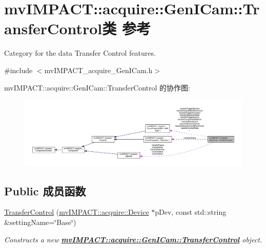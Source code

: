 \hypertarget{classmv_i_m_p_a_c_t_1_1acquire_1_1_gen_i_cam_1_1_transfer_control}{\section{mv\+I\+M\+P\+A\+C\+T\+:\+:acquire\+:\+:Gen\+I\+Cam\+:\+:Transfer\+Control类 参考}
\label{classmv_i_m_p_a_c_t_1_1acquire_1_1_gen_i_cam_1_1_transfer_control}
}


Category for the data Transfer Control features.  




{\ttfamily \#include $<$mv\+I\+M\+P\+A\+C\+T\+\_\+acquire\+\_\+\+Gen\+I\+Cam.\+h$>$}



mv\+I\+M\+P\+A\+C\+T\+:\+:acquire\+:\+:Gen\+I\+Cam\+:\+:Transfer\+Control 的协作图\+:
\nopagebreak
\begin{figure}[H]
\begin{center}
\leavevmode
\includegraphics[width=350pt]{classmv_i_m_p_a_c_t_1_1acquire_1_1_gen_i_cam_1_1_transfer_control__coll__graph}
\end{center}
\end{figure}
\subsection*{Public 成员函数}
\begin{DoxyCompactItemize}
\item 
\hyperlink{classmv_i_m_p_a_c_t_1_1acquire_1_1_gen_i_cam_1_1_transfer_control_adad46463fabd024836f409e36c72ab46}{Transfer\+Control} (\hyperlink{classmv_i_m_p_a_c_t_1_1acquire_1_1_device}{mv\+I\+M\+P\+A\+C\+T\+::acquire\+::\+Device} $\ast$p\+Dev, const std\+::string \&setting\+Name=\char`\"{}Base\char`\"{})
\begin{DoxyCompactList}\small\item\em Constructs a new {\bfseries \hyperlink{classmv_i_m_p_a_c_t_1_1acquire_1_1_gen_i_cam_1_1_transfer_control}{mv\+I\+M\+P\+A\+C\+T\+::acquire\+::\+Gen\+I\+Cam\+::\+Transfer\+Control}} object. \end{DoxyCompactList}\end{DoxyCompactItemize}
